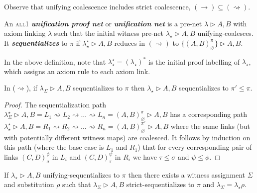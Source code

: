 \documentclass[UKenglish]{lipics-v2016}
\theoremstyle{plain}
\newcommand\defn[1]{\textit{\textbf{#1}}}
\newcommand\all{\textsc{all}}
\newcommand\+{+}
\renewcommand\*{\times}
\newcommand\net[3]{#1\triangleright #2,#3}
\newcommand\link[3][\sigma]{(#2,#3)_{#1}}
\newcommand\scoal{\rightarrow} %
\newcommand\ucoal{\rightsquigarrow}
\begin{document}
Observe that unifying coalescence includes strict coalescence, $(\scoal)\subseteq(\ucoal)$.

\begin{definition}
An \all1 \defn{unification proof net} or \defn{unification net} is a pre-net $\net\lambda AB$ with axiom linking $\lambda$ such that the initial witness pre-net $\net{\lambda_\star}AB$ unifying-coalesces. It \defn{sequentializes} to $\pi$ if $\net{\lambda^\star_\star}AB$ reduces in $(\ucoal)$ to $\net{\{\link[\varnothing]AB^\pi\}}AB$.
\end{definition}

In the above definition, note that $\lambda_\star^\star=(\lambda_\star)^*$ is the initial proof labelling of $\lambda_\star$, which assigns an axiom rule to each axiom link.

\begin{lemma}
\label{lem:ucoal generality}
In ($\ucoal$), if $\net{\lambda_\Sigma}AB$ sequentializes to $\pi$ then $\net{\lambda_\star}AB$ sequentializes to $\pi'\leq\pi$.
\end{lemma}

\begin{proof}
The sequentialization path
$
	\net{\lambda_\Sigma^\star}AB = 
	L_1 \ucoal L_2 \ucoal \dots \ucoal L_n = 
	\net{\link[\varnothing]AB^\pi}AB
$
has a corresponding path
$
	\net{\lambda_\star^\star}AB = 
	R_1 \ucoal R_2 \ucoal \dots \ucoal R_n =
	\net{\link[\varnothing]AB^{\pi'}}AB
$
where the same links (but with potentially different witness maps) are coalesced. It follows by induction on this path (where the base case is $L_1$ and $R_1$) that for every corresponding pair of links $\link CD^\phi$ in $L_i$ and $\link[\tau]CD^\psi$ in $R_i$ we have $\tau\leq\sigma$ and $\psi\leq\phi$.
\end{proof}

\begin{lemma}
\label{lem:unifying implies strict coalescence}
If $\net{\lambda_\star}AB$ unifying-sequentializes to $\pi$ then there exists a witness assignment $\Sigma$ and substitution $\rho$ such that $\net{\lambda_\Sigma}AB$ strict-sequentializes to $\pi$ and $\lambda_\Sigma=\lambda_\star\rho$.
\end{lemma}
\end{document}
